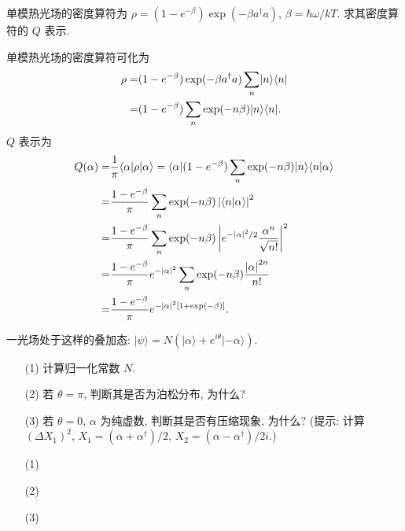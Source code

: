 \documentclass{assignment}
\begin{document}
\begin{prob}
    单模热光场的密度算符为 $\rho=(1-e^{-\beta})\exp(-\beta a^{\dagger}a)$, $\beta=\hbar\omega/kT$. 求其密度算符的 $Q$ 表示.
\end{prob}
\begin{sol}
    单模热光场的密度算符可化为
    \begin{align}
        \notag\rho=&(1-e^{-\beta})\exp(-\beta a^{\dagger}a)\sum_n\lvert n\rangle\langle n\rvert\\
        \notag=&(1-e^{-\beta})\sum_n\exp(-n\beta)\lvert n\rangle\langle n\rvert.
    \end{align}
    $Q$ 表示为
    \begin{align}
        \notag Q(\alpha)=&\frac{1}{\pi}\langle\alpha\rvert\rho\lvert\alpha\rangle=\langle\alpha\rvert(1-e^{-\beta})\sum_n\exp(-n\beta)\lvert n\rangle\langle n\vert\alpha\rangle\\
        \notag=&\frac{1-e^{-\beta}}{\pi}\sum_n\exp(-n\beta)\left\lvert\langle n\vert\alpha\rangle\right\rvert^2\\
        \notag=&\frac{1-e^{-\beta}}{\pi}\sum_n\exp(-n\beta)\left\lvert e^{-\left\lvert\alpha\right\rvert^2/2}\frac{\alpha^n}{\sqrt{n!}}\right\rvert^2\\
        \notag=&\frac{1-e^{-\beta}}{\pi}e^{-\left\lvert\alpha\right\rvert^2}\sum_n\exp(-n\beta)\frac{\left\lvert\alpha\right\rvert^{2n}}{n!}\\
        =&\frac{1-e^{-\beta}}{\pi}e^{-\left\lvert\alpha\right\rvert^2[1+\exp(-\beta)]}.
    \end{align}
\end{sol}

\begin{prob}
    一光场处于这样的叠加态: $\lvert\psi\rangle=N(\lvert\alpha\rangle+e^{i\theta}\lvert-\alpha\rangle)$.
    \begin{itemize}
        \item[(1)] 计算归一化常数 $N$.
        \item[(2)] 若 $\theta=\pi$, 判断其是否为泊松分布, 为什么?
        \item[(3)] 若 $\theta=0$, $\alpha$ 为纯虚数, 判断其是否有压缩现象, 为什么? (提示: 计算 $(\Delta X_1)^2$, $X_1=(\alpha+\alpha^{\dagger})/2$, $X_2=(\alpha-\alpha^{\dagger})/2i$.)
    \end{itemize}
\end{prob}
\begin{sol}
    \begin{itemize}
        \item[(1)] 
        \item[(2)] 
        \item[(3)] 
    \end{itemize}
\end{sol}
\end{document}
